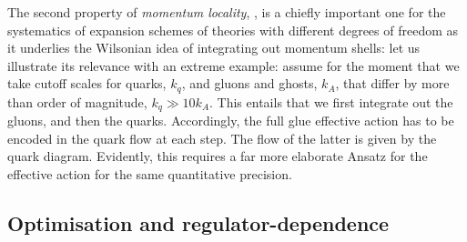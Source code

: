 \documentclass[aps,twocolumn,prd,superscriptaddress]{revtex4-2}
\begin{document}
The second property of \textit{momentum locality}, \cite{Christiansen:2015rva}, is a chiefly important one for the systematics of expansion schemes of theories with different degrees of freedom as it underlies the Wilsonian idea of integrating out momentum shells: let us illustrate its relevance with an extreme example: assume for the moment that we take cutoff scales for quarks, $k_q$, and gluons and ghosts, $k_A$, that differ by more than order of magnitude, $k_q\gg 10 k_A$.
This entails that we first integrate out the gluons, and then the quarks. Accordingly, the full glue effective action has to be encoded in the quark flow at each step. The flow of the latter is given by the quark diagram. Evidently, this requires a far more elaborate Ansatz for the effective action for the same quantitative precision.


\subsection{Optimisation and regulator-dependence}
\label{sec:optimisation}
\end{document}
